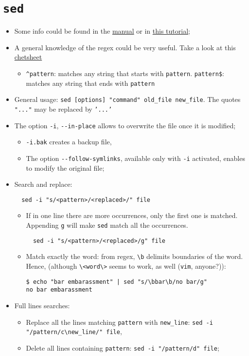 \documentclass[a4paper,12pt,%
              final%
              ]{article}
\begin{document}
\section{\texttt{sed}}
\begin{itemize}
  \item Some info could be found in the \href{https://www.gnu.org/software/sed/manual/sed.html}{manual} or in \href{http://www.grymoire.com/Unix/Sed.html}{this tutorial};
  \item A general knowledge of the regex could be very useful. Take a look at this \href{https://medium.com/factory-mind/regex-tutorial-a-simple-cheatsheet-by-examples-649dc1c3f285}{chetsheet}
    \begin{itemize}
      \item \verb|^pattern|: matches any string that starts with \texttt{pattern}. \verb|pattern$|: matches any string that ends with \texttt{pattern}
    \end{itemize}
  \item General usage: \verb|sed [options] "command" old_file new_file|. The quotes \texttt{"..."} may be replaced by \texttt{'...'}
  \item The option \verb|-i|, \verb|--in-place| allows to overwrite the file once it is modified;
    \begin{itemize}
      \item \verb|-i.bak| creates a backup file,
      \item The option \verb|--follow-symlinks|, available only with \verb|-i| activated, enables to modify the original file;
    \end{itemize}
  \item Search and replace:
\begin{verbatim}
  sed -i "s/<pattern>/<replaced>/" file
\end{verbatim}
  \begin{itemize}
    \item If in one line there are more occurrences, only the first one is matched. Appending \texttt{g} will make \texttt{sed} match all the occurrences.
\begin{verbatim}
  sed -i "s/<pattern>/<replaced>/g" file
\end{verbatim}
    \item Match exactly the word: from regex, \verb|\b| delimits boundaries of the word. Hence, (although \verb|\<word\>| seems to work, as well (\texttt{vim}, anyone?)):
\begin{verbatim}
$ echo "bar embarassment" | sed "s/\bbar\b/no bar/g"
no bar embarassment
\end{verbatim}
  \end{itemize}
  \item Full lines searches:
    \begin{itemize}
    \item Replace all the lines matching \texttt{pattern} with \verb|new_line|: \verb|sed -i "/pattern/c\new_line/" file|,
    \item Delete all lines containing \texttt{pattern}: \verb|sed -i "/pattern/d" file|;
    \end{itemize}
\end{itemize}
\end{document}
